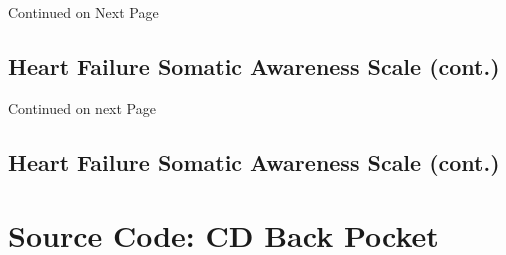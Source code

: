 \documentclass{umthesis}
\begin{document}
\begin{appendices}
\noindent Continued on Next Page

\section*{Heart Failure Somatic Awareness Scale (cont.)}
\noindent{}

\noindent Continued on next Page

\section*{Heart Failure Somatic Awareness Scale (cont.)}
\noindent{}

\chapter{Source Code: CD Back Pocket}

\end{appendices}
\end{document}
